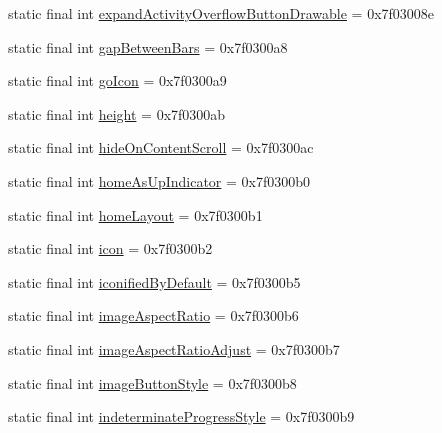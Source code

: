 \begin{DoxyCompactItemize}
\item 
static final int \mbox{\hyperlink{classcom_1_1google_1_1android_1_1gms_1_1R_1_1attr_a4417e8d5fdabe02846f81022655c3434}{expand\+Activity\+Overflow\+Button\+Drawable}} = 0x7f03008e
\item 
static final int \mbox{\hyperlink{classcom_1_1google_1_1android_1_1gms_1_1R_1_1attr_aed528e95e96fd970893812a40a7898c5}{gap\+Between\+Bars}} = 0x7f0300a8
\item 
static final int \mbox{\hyperlink{classcom_1_1google_1_1android_1_1gms_1_1R_1_1attr_a085a389fbf12360484329a28059f44b9}{go\+Icon}} = 0x7f0300a9
\item 
static final int \mbox{\hyperlink{classcom_1_1google_1_1android_1_1gms_1_1R_1_1attr_af891c90515ee35b78c9edd18e7c14bb5}{height}} = 0x7f0300ab
\item 
static final int \mbox{\hyperlink{classcom_1_1google_1_1android_1_1gms_1_1R_1_1attr_a244ae0e12961eff0032c56c6b2bafa7e}{hide\+On\+Content\+Scroll}} = 0x7f0300ac
\item 
static final int \mbox{\hyperlink{classcom_1_1google_1_1android_1_1gms_1_1R_1_1attr_a6177dd5db0ae78e83c7d63d2c220ab27}{home\+As\+Up\+Indicator}} = 0x7f0300b0
\item 
static final int \mbox{\hyperlink{classcom_1_1google_1_1android_1_1gms_1_1R_1_1attr_a689ea66f95ff552547e4f1be301fc4c6}{home\+Layout}} = 0x7f0300b1
\item 
static final int \mbox{\hyperlink{classcom_1_1google_1_1android_1_1gms_1_1R_1_1attr_ac85e431982fe5743a99139c21111949c}{icon}} = 0x7f0300b2
\item 
static final int \mbox{\hyperlink{classcom_1_1google_1_1android_1_1gms_1_1R_1_1attr_af37b553cf3ba32aee8213babedcc941a}{iconified\+By\+Default}} = 0x7f0300b5
\item 
static final int \mbox{\hyperlink{classcom_1_1google_1_1android_1_1gms_1_1R_1_1attr_a341ebc4b423f04cff139da9d1b388d2c}{image\+Aspect\+Ratio}} = 0x7f0300b6
\item 
static final int \mbox{\hyperlink{classcom_1_1google_1_1android_1_1gms_1_1R_1_1attr_aa71853ab92c730e053ceee36b3c92b77}{image\+Aspect\+Ratio\+Adjust}} = 0x7f0300b7
\item 
static final int \mbox{\hyperlink{classcom_1_1google_1_1android_1_1gms_1_1R_1_1attr_a7a7f9df7da5ac621bf0ef240fb023e3d}{image\+Button\+Style}} = 0x7f0300b8
\item 
static final int \mbox{\hyperlink{classcom_1_1google_1_1android_1_1gms_1_1R_1_1attr_abea3e52496c71a0a52c1474071ee24af}{indeterminate\+Progress\+Style}} = 0x7f0300b9

\end{DoxyCompactItemize}
